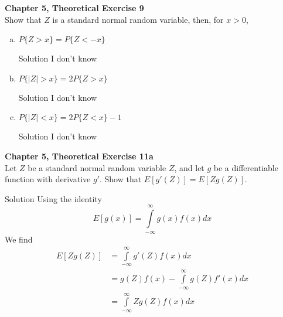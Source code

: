 \documentclass{article}
\begin{document}
\begin{spacing}{1.1}
\newpage
\begin{homeworkProblem}
  {\bf Chapter 5, Theoretical Exercise 9}\\
  Show that $Z$ is a standard normal random variable,
  then, for $x > 0$,
  \begin{enumerate}[(a)]
    \item $P\{ Z > x\} = P\{ Z < −x\}$
      \begin{homeworkSection}{Solution}
          I don't know
        
      \end{homeworkSection}
    \item $P\{ |Z| > x\} = 2 P\{ Z > x\}$
      \begin{homeworkSection}{Solution}
       I don't know 
      \end{homeworkSection}
    \item $P\{ |Z| < x \} = 2 P\{ Z < x \} − 1$
      \begin{homeworkSection}{Solution}
        I don't know 
      \end{homeworkSection}
    \end{enumerate}
\end{homeworkProblem}

\newpage
\begin{homeworkProblem}
  {\bf Chapter 5, Theoretical Exercise 11a}\\
  Let $Z$ be a standard normal random variable $Z$, and let 
  $g$ be a differentiable function with derivative $g'$.
  Show that $E[ g'(Z)] = E[Zg(Z)]$.
  \begin{homeworkSection}{Solution}
    Using the identity
      \[E[ g(x)] = \int\limits_{-\infty}^{\infty} g(x)f(x) dx \]
    We find
    \begin{align*}
      E[Zg(Z)]  &= \int\limits_{-\infty}^{\infty} g'(Z)f(x) dx\\
                &= g(Z)f(x) -  \int\limits_{-\infty}^{\infty} g(Z)f'(x) dx\\
                &= \int\limits_{-\infty}^{\infty} Zg(Z)f(x) dx
    \end{align*}
  \end{homeworkSection}
\end{homeworkProblem}


\end{spacing}
\end{document}
